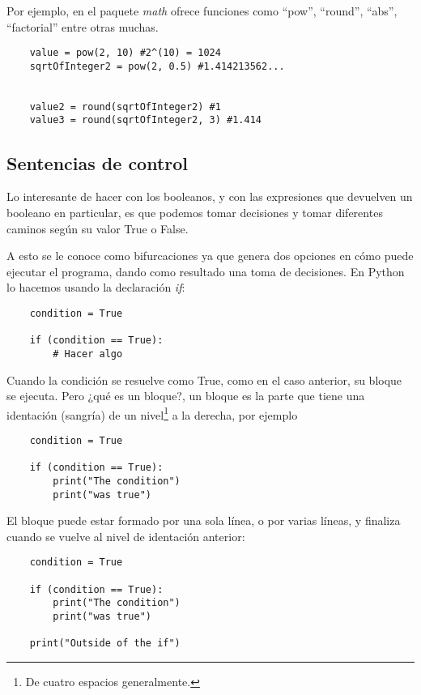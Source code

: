 \documentclass[12pt]{article}
\begin{document}
    Por ejemplo, en el paquete \textit{math} ofrece funciones como ``pow'', ``round'', ``abs'', ``factorial'' entre otras muchas.
    \begin{lstlisting}
    value = pow(2, 10) #2^(10) = 1024
    sqrtOfInteger2 = pow(2, 0.5) #1.414213562...


    value2 = round(sqrtOfInteger2) #1
    value3 = round(sqrtOfInteger2, 3) #1.414
    \end{lstlisting}



    \subsection{Sentencias de control}

    Lo interesante de hacer con los booleanos, y con las expresiones que devuelven un booleano en particular, es que
    podemos tomar decisiones y tomar diferentes caminos según su valor True o False.

    A esto se le conoce como bifurcaciones ya que genera dos opciones en cómo puede ejecutar el programa, dando como resultado
    una toma de decisiones.
    En Python lo hacemos usando la declaración \textit{if}:

    \begin{lstlisting}
    condition = True

    if (condition == True):
        # Hacer algo
    \end{lstlisting}

    Cuando la condición se resuelve como True, como en el caso anterior, su bloque se ejecuta.
    Pero ¿qué es un bloque?, un bloque es la parte que tiene una identación (sangría) de un nivel\footnote{De cuatro espacios generalmente.} a la derecha,
    por ejemplo

    \begin{lstlisting}
    condition = True

    if (condition == True):
        print("The condition")
        print("was true")
    \end{lstlisting}

    El bloque puede estar formado por una sola línea, o por varias líneas, y finaliza cuando se vuelve al nivel de identación anterior:

    \begin{lstlisting}
    condition = True

    if (condition == True):
        print("The condition")
        print("was true")

    print("Outside of the if")
    \end{lstlisting}
\end{document}
